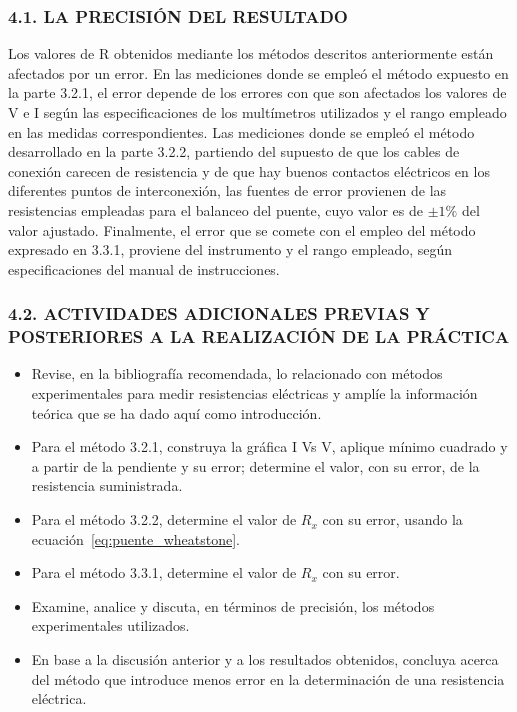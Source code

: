 \documentclass[12pt, a4paper]{article}
\begin{document}
\subsubsection*{4.1. LA PRECISIÓN DEL RESULTADO}
Los valores de R obtenidos mediante los métodos descritos anteriormente están afectados por un error. En las mediciones donde se 
empleó el método expuesto en la parte 3.2.1, el error depende de los errores con que son afectados los valores de V e I según las 
especificaciones de los multímetros utilizados y el rango empleado en las medidas correspondientes. Las mediciones donde se empleó 
el método desarrollado en la parte 3.2.2, partiendo del supuesto de que los cables de conexión carecen de resistencia y de que hay 
buenos contactos eléctricos en los diferentes puntos de interconexión, las fuentes de error provienen de las resistencias empleadas 
para el balanceo del puente, cuyo valor es de $\pm 1\%$ del valor ajustado. Finalmente, el error que se comete con el empleo del 
método expresado en 3.3.1, proviene del instrumento y el rango empleado, según especificaciones del manual de instrucciones.

\subsubsection*{4.2. ACTIVIDADES ADICIONALES PREVIAS Y POSTERIORES A LA REALIZACIÓN DE LA PRÁCTICA}
\begin{itemize}
    \item Revise, en la bibliografía recomendada, lo relacionado con métodos experimentales para medir resistencias eléctricas y 
    amplíe la información teórica que se ha dado aquí como introducción.
    \item Para el método 3.2.1, construya la gráfica I Vs V, aplique mínimo cuadrado y a partir de la pendiente y su error; 
    determine el valor, con su error, de la resistencia suministrada.
    \item Para el método 3.2.2, determine el valor de $R_x$ con su error, usando la ecuación~\eqref{eq:puente_wheatstone}.
    \item Para el método 3.3.1, determine el valor de $R_x$ con su error.
    \item Examine, analice y discuta, en términos de precisión, los métodos experimentales utilizados.
    \item En base a la discusión anterior y a los resultados obtenidos, concluya acerca del método que introduce menos error en la 
    determinación de una resistencia eléctrica.
\end{itemize}
\end{document}

